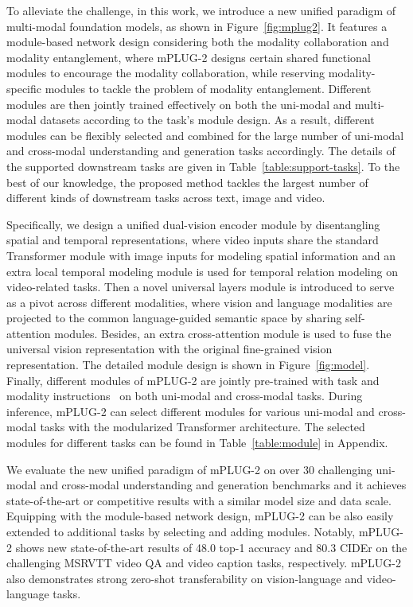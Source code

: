 \documentclass{article}
\theoremstyle{plain}
\theoremstyle{definition}
\theoremstyle{remark}
\newcommand{\modelname}{mPLUG-2 }
\begin{document}
To alleviate the challenge, in this work, we introduce a new unified paradigm of multi-modal foundation models, as shown in Figure~\ref{fig:mplug2}. It features a module-based network design considering both the modality collaboration and modality entanglement, where \modelname designs certain shared functional modules to encourage the modality collaboration, while reserving modality-specific modules to tackle the problem of modality entanglement. Different modules are then jointly trained effectively on both the uni-modal and multi-modal datasets according to the task's module design. As a result, different modules can be flexibly selected and combined for the large number of uni-modal and cross-modal understanding and generation tasks accordingly. The details of the supported downstream tasks are given in Table~\ref{table:support-tasks}. To the best of our knowledge, the proposed method tackles the largest number of different kinds of downstream tasks across text, image and video.



Specifically, we design a unified dual-vision encoder module by disentangling spatial and temporal representations, where video inputs share the standard Transformer module with image inputs for modeling spatial information and an extra local temporal modeling module is used for temporal relation modeling on video-related tasks. Then a novel universal layers module is introduced to serve as a pivot across different modalities, where vision and language modalities are projected to the common language-guided semantic space by sharing self-attention modules. Besides, an extra cross-attention module is used to fuse the universal vision representation with the original fine-grained vision representation. The detailed module design is shown in Figure~\ref{fig:model}. Finally, different modules of \modelname are jointly pre-trained with task and modality instructions~\citep{Wang2022OFA} on both uni-modal and cross-modal tasks. During inference, \modelname can select different modules for various uni-modal and cross-modal tasks with the modularized Transformer architecture. The selected modules for different tasks can be found in Table~\ref{table:module} in Appendix. 





We evaluate the new unified paradigm of \modelname on over 30 challenging uni-modal and cross-modal understanding and generation benchmarks and it achieves state-of-the-art or competitive results with a similar model size and data scale. Equipping with the module-based network design, \modelname can be also easily extended to additional tasks by selecting and adding modules. Notably, \modelname shows new state-of-the-art results of 48.0 top-1 accuracy and 80.3 CIDEr on the challenging MSRVTT video QA and video caption tasks, respectively. \modelname also demonstrates strong zero-shot transferability on vision-language and video-language tasks. 
\end{document}
